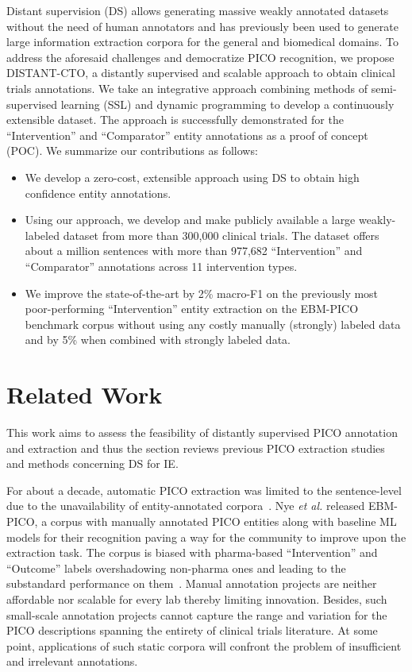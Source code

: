 \documentclass[letterpaper]{article} %
\begin{document}
Distant supervision (DS) allows generating massive weakly annotated datasets without the need of human annotators and has previously been used to generate large information extraction corpora for the general and biomedical domains.
To address the aforesaid challenges and democratize PICO recognition, we propose DISTANT-CTO, a distantly supervised and scalable approach to obtain clinical trials annotations.
We take an integrative approach combining methods of semi-supervised learning (SSL) and dynamic programming to develop a continuously extensible dataset.
The approach is successfully demonstrated for the ``Intervention'' and ``Comparator'' entity annotations as a proof of concept (POC).
We summarize our contributions as follows:
%
\begin{itemize}
    \item We develop a zero-cost, extensible approach using DS to obtain high confidence entity annotations.
    \item Using our approach, we develop and make publicly available a large weakly-labeled dataset from more than 300,000 clinical trials. The dataset offers about a million sentences with more than 977,682 ``Intervention'' and ``Comparator'' annotations across 11 intervention types.
    \item We improve the state-of-the-art by 2\% macro-F1 on the previously most poor-performing ``Intervention'' entity extraction on the EBM-PICO benchmark corpus without using any costly manually (strongly) labeled data and by 5\% when combined with strongly labeled data.
\end{itemize}
%
\section{Related Work}
\label{sec:relworks}
%
This work aims to assess the feasibility of distantly supervised PICO annotation and extraction and thus the section reviews previous PICO extraction studies and methods concerning DS for IE.

For about a decade, automatic PICO extraction was limited to the sentence-level due to the unavailability of entity-annotated corpora~\citep{boudin2010combining, huang2011classification, huang2013pico, wallace2016extracting, jin2018pico}.
Nye \textit{et al.} released EBM-PICO, a corpus with manually annotated PICO entities along with baseline ML models for their recognition paving a way for the community to improve upon the extraction task.
The corpus is biased with pharma-based ``Intervention'' and ``Outcome'' labels overshadowing non-pharma ones and leading to the substandard performance on them~\citep{nye2018corpus,beltagy2019scibert,brockmeier2019improving,zhang2020unlocking}.
Manual annotation projects are neither affordable nor scalable for every lab thereby limiting innovation.
Besides, such small-scale annotation projects cannot capture the range and variation for the PICO descriptions spanning the entirety of clinical trials literature.
At some point, applications of such static corpora will confront the problem of insufficient and irrelevant annotations.
\end{document}
